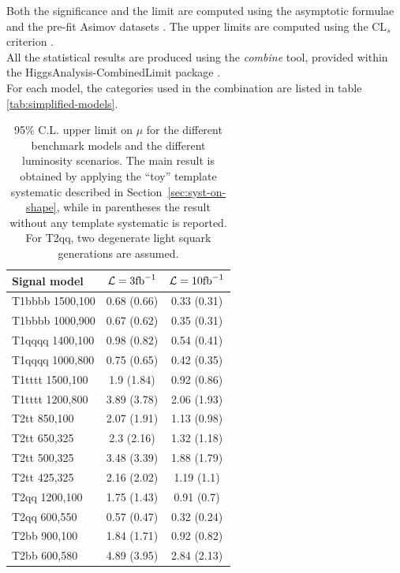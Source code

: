 Both the significance and the limit are computed using the asymptotic formulae and the pre-fit Asimov datasets \cite{AsymptoticFormulae}. 
The upper limits are computed using the $\text{CL}_{s}$ criterion \cite{CLsTechnique}. \\
All the statistical results are produced using the \textit{combine} tool, 
provided within the HiggsAnalysis-CombinedLimit package \cite{Combine}. \\
For each model, the categories used in the combination are listed in table \ref{tab:simplified-models}. 

\begin{table}
  \centering
  \caption{95\% C.L. upper limit on $\mu$ for the different benchmark models and the different luminosity scenarios. 
  The main result is obtained by applying 
  the ``toy'' template systematic described in Section~\ref{sec:syst-on-shape}, 
while in parentheses the result without any template systematic is reported. 
For T2qq, two degenerate light squark generations are assumed.}
  \label{tab:results_ul}
  \footnotesize
  \begin{tabular}{lcc}
    \hline
    \hline
    Signal model & $\mathcal{L} = 3 \text{fb}^{-1}$ & $\mathcal{L} = 10 \text{fb}^{-1}$ \\
    \hline
    \hline
    T1bbbb 1500,100  & 0.68 (0.66) & 0.33 (0.31) \\ 
    T1bbbb 1000,900  & 0.67 (0.62) & 0.35 (0.31) \\ 
    T1qqqq 1400,100  & 0.98 (0.82) & 0.54 (0.41) \\ 
    T1qqqq 1000,800  & 0.75 (0.65) & 0.42 (0.35) \\ 
    T1tttt 1500,100  & 1.9 (1.84) & 0.92 (0.86) \\  
    T1tttt 1200,800  & 3.89 (3.78) & 2.06 (1.93) \\ \hline
    T2tt 850,100     & 2.07 (1.91) & 1.13 (0.98) \\ 
    T2tt 650,325     & 2.3 (2.16) & 1.32 (1.18) \\  
    T2tt 500,325     & 3.48 (3.39) & 1.88 (1.79) \\ 
    T2tt 425,325     & 2.16 (2.02) & 1.19 (1.1) \\  
    T2qq 1200,100    & 1.75 (1.43) & 0.91 (0.7) \\  
    T2qq 600,550     & 0.57 (0.47) & 0.32 (0.24) \\ 
    T2bb 900,100     & 1.84 (1.71) & 0.92 (0.82) \\ 
    T2bb 600,580     & 4.89 (3.95) & 2.84 (2.13) \\ 
    \hline
    \hline
  \end{tabular} 
\end{table}


